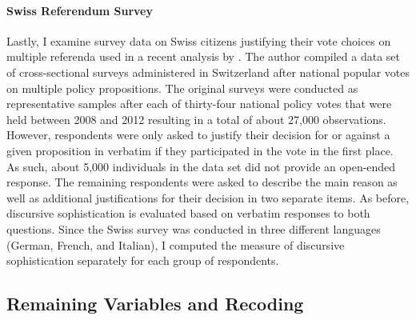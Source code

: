 \paragraph{Swiss Referendum Survey}
Lastly, I examine survey data on Swiss citizens justifying their vote choices on multiple referenda used in a recent analysis by \citet{colombo2016justifications}. The author compiled a data set of cross-sectional surveys administered in Switzerland after national popular votes on multiple policy propositions. The original surveys were conducted as representative samples after each of thirty-four national policy votes that were held between 2008 and 2012 resulting in a total of about 27,000 observations. However, respondents were only asked to justify their decision for or against a given proposition in verbatim if they participated in the vote in the first place. As such, about 5,000 individuals in the data set did not provide an open-ended response. The remaining respondents were asked to describe the main reason as well as additional justifications for their decision in two separate items. As before, discursive sophistication is evaluated based on verbatim responses to both questions. Since the Swiss survey was conducted in three different languages (German, French, and Italian), I computed the measure of discursive sophistication separately for each group of respondents.



\subsection{Remaining Variables and Recoding}

